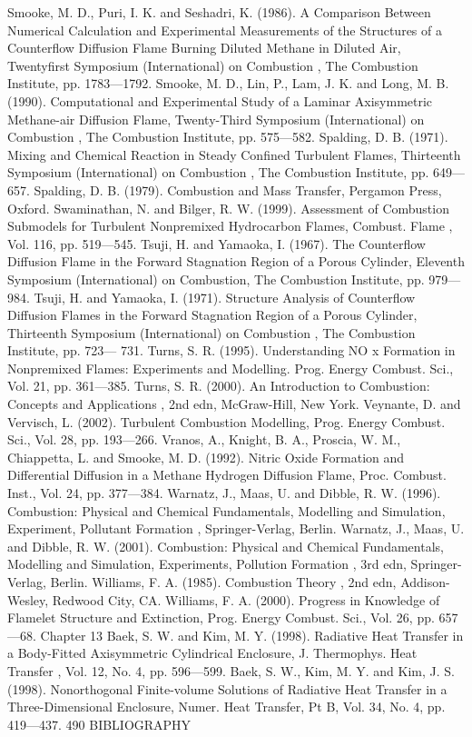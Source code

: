 \documentclass[11pt,a4paper,openany,fontset=none]{ctexbook}
\begin{document}
\begin{sloppypar}
{\small Smooke, M. D., Puri, I. K. and Seshadri, K. (1986). A Comparison Between Numerical Calculation and Experimental Measurements of the Structures of a Counterflow Diffusion Flame Burning Diluted Methane in Diluted Air, Twentyfirst Symposium (International) on Combustion , The Combustion Institute, pp. 1783—1792. Smooke, M. D., Lin, P., Lam, J. K. and Long, M. B. (1990). Computational and Experimental Study of a Laminar Axisymmetric Methane-air Diffusion Flame, Twenty-Third Symposium (International) on Combustion , The Combustion Institute, pp. 575—582. Spalding, D. B. (1971). Mixing and Chemical Reaction in Steady Confined Turbulent Flames, Thirteenth Symposium (International) on Combustion , The Combustion Institute, pp. 649—657. Spalding, D. B. (1979). Combustion and Mass Transfer, Pergamon Press, Oxford. Swaminathan, N. and Bilger, R. W. (1999). Assessment of Combustion Submodels for Turbulent Nonpremixed Hydrocarbon Flames, Combust. Flame , Vol. 116, pp. 519—545. Tsuji, H. and Yamaoka, I. (1967). The Counterflow Diffusion Flame in the Forward Stagnation Region of a Porous Cylinder, Eleventh Symposium (International) on Combustion, The Combustion Institute, pp. 979—984. Tsuji, H. and Yamaoka, I. (1971). Structure Analysis of Counterflow Diffusion Flames in the Forward Stagnation Region of a Porous Cylinder, Thirteenth Symposium (International) on Combustion , The Combustion Institute, pp. 723— 731. Turns, S. R. (1995). Understanding NO x Formation in Nonpremixed Flames: Experiments and Modelling. Prog. Energy Combust. Sci., Vol. 21, pp. 361—385. Turns, S. R. (2000). An Introduction to Combustion: Concepts and Applications , 2nd edn, McGraw-Hill, New York. Veynante, D. and Vervisch, L. (2002). Turbulent Combustion Modelling, Prog. Energy Combust. Sci., Vol. 28, pp. 193—266. Vranos, A., Knight, B. A., Proscia, W. M., Chiappetta, L. and Smooke, M. D. (1992). Nitric Oxide Formation and Differential Diffusion in a Methane Hydrogen Diffusion Flame, Proc. Combust. Inst., Vol. 24, pp. 377—384. Warnatz, J., Maas, U. and Dibble, R. W. (1996). Combustion: Physical and Chemical Fundamentals, Modelling and Simulation, Experiment, Pollutant Formation , Springer-Verlag, Berlin. Warnatz, J., Maas, U. and Dibble, R. W. (2001). Combustion: Physical and Chemical Fundamentals, Modelling and Simulation, Experiments, Pollution Formation , 3rd edn, Springer-Verlag, Berlin. Williams, F. A. (1985). Combustion Theory , 2nd edn, Addison-Wesley, Redwood City, CA. Williams, F. A. (2000). Progress in Knowledge of Flamelet Structure and Extinction, Prog. Energy Combust. Sci., Vol. 26, pp. 657—68. Chapter 13 Baek, S. W. and Kim, M. Y. (1998). Radiative Heat Transfer in a Body-Fitted Axisymmetric Cylindrical Enclosure, J. Thermophys. Heat Transfer , Vol. 12, No. 4, pp. 596—599. Baek, S. W., Kim, M. Y. and Kim, J. S. (1998). Nonorthogonal Finite-volume Solutions of Radiative Heat Transfer in a Three-Dimensional Enclosure, Numer. Heat Transfer, Pt B, Vol. 34, No. 4, pp. 419—437. 490 BIBLIOGRAPHY}\par

\end{sloppypar}
\end{document}
